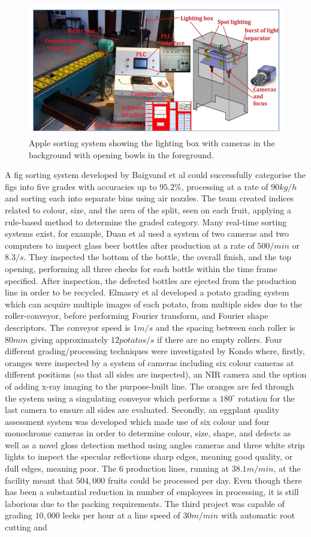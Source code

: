\documentclass[fleqn,twoside,12pt]{report}
\begin{document}
\begin{figure}[h]
	\centering
	\includegraphics[width=0.7\linewidth]{apple_system.png}
	\caption{Apple sorting system showing the lighting box with cameras in the background with opening bowls in the foreground.}
	\label{fig:apple_system}
\end{figure}%

A fig sorting system developed by Baigvand et al \cite{baigvand} could successfully categorise the figs into five grades with accuracies up to $95.2\%$, processing at a rate of $90kg/h$ and sorting each into separate bins using air nozzles. The team created indices related to colour, size, and the area of the split, seen on each fruit, applying a rule-based method to determine the graded category. Many real-time sorting systems exist, for example, Duan et al \cite{duan} used a system of two cameras and two computers to inspect glass beer bottles after production at a rate of $500/min$ or $8.3/s$. They inspected the bottom of the bottle, the overall finish, and the top opening, performing all three checks for each bottle within the time frame specified. After inspection, the defected bottles are ejected from the production line in order to be recycled. Elmasry et al \cite{elmasry1} developed a potato grading system which can acquire multiple images of each potato, from multiple sides due to the roller-conveyor, before performing Fourier transform, and Fourier shape descriptors. The conveyor speed is $1m/s$ and the spacing between each roller is $80mm$ giving approximately $12 potatos/s$ if there are no empty rollers. Four different grading/processing techniques were investigated by Kondo \cite{kondo} where, firstly, oranges were inspected by a system of cameras including six colour cameras at different positions (so that all sides are inspected), an NIR camera and the option of adding x-ray imaging to the purpose-built line. The oranges are fed through the system using a singulating conveyor which performs a $180^{\circ}$ rotation for the last camera to ensure all sides are evaluated. Secondly, an eggplant quality assessment system was developed which made use of six colour and four monochrome cameras in order to determine colour, size, shape, and defects as well as a novel gloss detection method using angles cameras and three white strip lights to inspect the specular reflections sharp edges, meaning good quality, or dull edges, meaning poor. The 6 production lines, running at $38.1m/min$, at the facility meant that $504,000$ fruits could be processed per day. Even though there has been a substantial reduction in number of employees in processing, it is still laborious due to the packing requirements. The third project was capable of grading $10,000$ leeks per hour at a line speed of $30m/min$ with automatic root cutting and 
\end{document}
